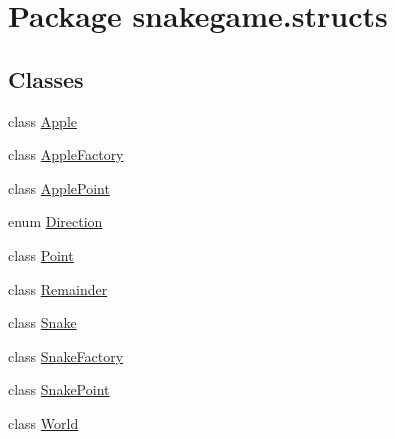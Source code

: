 \hypertarget{namespacesnakegame_1_1structs}{}\section{Package snakegame.\+structs}
\label{namespacesnakegame_1_1structs}
\subsection*{Classes}
\begin{DoxyCompactItemize}
\item 
class \mbox{\hyperlink{classsnakegame_1_1structs_1_1_apple}{Apple}}
\item 
class \mbox{\hyperlink{classsnakegame_1_1structs_1_1_apple_factory}{Apple\+Factory}}
\item 
class \mbox{\hyperlink{classsnakegame_1_1structs_1_1_apple_point}{Apple\+Point}}
\item 
enum \mbox{\hyperlink{enumsnakegame_1_1structs_1_1_direction}{Direction}}
\item 
class \mbox{\hyperlink{classsnakegame_1_1structs_1_1_point}{Point}}
\item 
class \mbox{\hyperlink{classsnakegame_1_1structs_1_1_remainder}{Remainder}}
\item 
class \mbox{\hyperlink{classsnakegame_1_1structs_1_1_snake}{Snake}}
\item 
class \mbox{\hyperlink{classsnakegame_1_1structs_1_1_snake_factory}{Snake\+Factory}}
\item 
class \mbox{\hyperlink{classsnakegame_1_1structs_1_1_snake_point}{Snake\+Point}}
\item 
class \mbox{\hyperlink{classsnakegame_1_1structs_1_1_world}{World}}
\end{DoxyCompactItemize}
